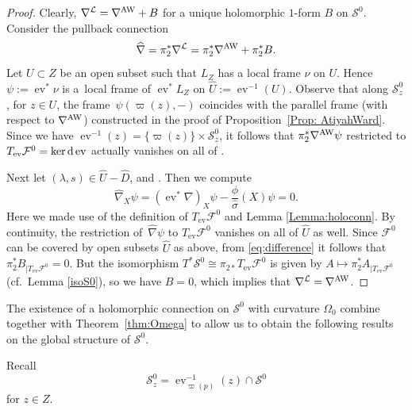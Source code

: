 \documentclass[pdftex]{sigma}
\numberwithin{equation}{section}
\theoremstyle{definition}
\begin{document}
\begin{proof}
Clearly, $\nabla^{\mathcal{L}} = \nabla^{\rm AW} + B$ for a unique holomorphic $1$-form $B$
on $\mathcal{S}^0$. Consider the pullback connection
\begin{equation}\label{eq:difference}
\widehat\nabla = \pi_2^*\nabla^{\mathcal{L}} = \pi_2^*\nabla^{\rm AW} + \pi_2^*B.
\end{equation}
Let $U \subset Z$ be an open subset such that $L_Z$ has a local frame $\nu$ on $U$. Hence
$\psi := \operatorname{ev}^*\nu$ is a~local frame of $\operatorname{ev}^*L_Z$ on $\widehat{U} :=
\operatorname{ev}^{-1}(U)$. Observe that along $\mathcal{S}^0_z$, for $z \in U$, the frame~$\psi(\varpi(z), -)$ coincides with the parallel frame \big(with respect to $\nabla^{\rm AW}$\big)
constructed in the proof of Proposition~\ref{Prop: AtiyahWard}. Since we have $\operatorname{ev}^{-1}(z) =
\{\varpi(z)\} \times \mathcal{S}^0_z$, it follows that $\pi_2^*\nabla^{\rm AW}\psi$ restricted to
$T_{\operatorname{ev}}\mathcal{F}^0 = \ker {\rm d}\operatorname{ev}$ actually vanishes on all of .

Next let $(\lambda, s) \in \widehat{U} - \widehat{D}$, and .
Then we compute
\[
\widehat{\nabla}_X \psi = (\operatorname{ev}^*\nabla)_X \psi - \frac{\phi}{\widehat{\sigma}}(X)\psi
 = 0.
\]
Here we made use of the definition of $T_{\operatorname{ev}}\mathcal{F}^0$ and Lemma \ref{Lemma:holoconn}.
By continuity, the restriction of~$\widehat{\nabla}\psi$ to
$T_{\operatorname{ev}}\mathcal{F}^0$ vanishes on all of $\widehat{U}$ as well.
Since $\mathcal{F}^0$ can be covered by open subsets $\widehat{U}$ as above, from
\eqref{eq:difference} it follows that $\pi_2^*B_{|T_{\operatorname{ev}}\mathcal{F}^0} = 0$.
But the isomorphism $T^*\mathcal{S}^0 \cong \pi_{2*}T_{\operatorname{ev}}\mathcal{F}^0$ is given
by $A \longmapsto \pi_2^*A_{|T_{\operatorname{ev}}\mathcal{F}^0}$ (cf.\ Lemma \ref{isoS0}),
so we have $B = 0$, which implies that $\nabla^{\mathcal{L}} = \nabla^{\rm AW}$.
\end{proof}

The existence of a holomorphic connection on $\mathcal S^0$ with curvature $\Omega_0$ combine together
with Theorem~\ref{thm:Omega} to allow us to obtain the following results on the global
structure of $\mathcal S^0$.

Recall
\[\mathcal{S}^0_z = \operatorname{ev}_{\varpi(p)}^{-1}(z) \cap
\mathcal{S}^0\]
for $z \in Z$.
\end{document}
